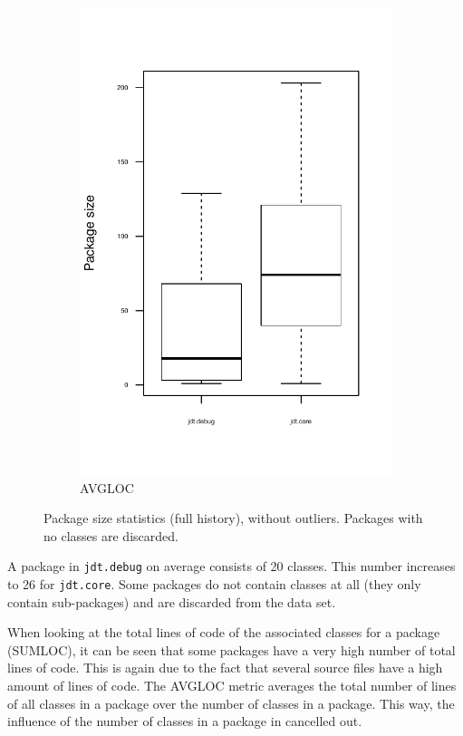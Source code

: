 \begin{figure}
        \begin{subfigure}[b]{0.48\textwidth}
                \centering
                \includegraphics[width=\textwidth]{img/package-size-avgloc-zoomed.pdf}
                \caption{AVGLOC}
        \end{subfigure}
		\caption{Package size statistics (full history), without outliers. Packages with no classes are discarded.}
		\label{fig:package-stats-zoomed}
\end{figure}

A package in \texttt{jdt.debug} on average consists of 20 classes. This number increases to 26 for \texttt{jdt.core}. Some packages do not contain classes at all (they only contain sub-packages) and are discarded from the data set.

When looking at the total lines of code of the associated classes for a package (SUMLOC), it can be seen that some packages have a very high number of total lines of code. This is again due to the fact that several source files have a high amount of lines of code. The AVGLOC metric averages the total number of lines of all classes in a package over the number of classes in a package. This way, the influence of the number of classes in a package in cancelled out.

